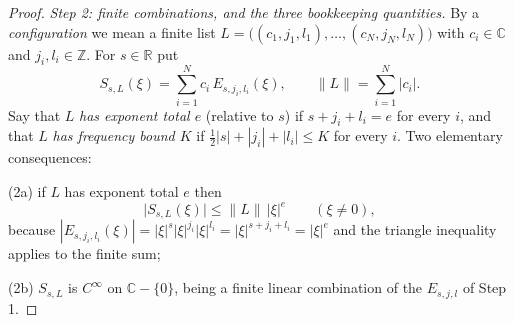 \begin{proof}
\emph{Step 2: finite combinations, and the three bookkeeping quantities.}  By
a \emph{configuration} we mean a finite list
$L=\bigl((c_1,j_1,l_1),\dots,(c_N,j_N,l_N)\bigr)$ with $c_i\in\mathbb{C}$ and
$j_i,l_i\in\mathbb{Z}$.  For $s\in\mathbb{R}$ put
\[
  S_{s,L}(\xi)=\sum_{i=1}^{N}c_i\,E_{s,j_i,l_i}(\xi),
  \qquad
  \|L\|=\sum_{i=1}^{N}|c_i| .
\]
Say that $L$ \emph{has exponent total $e$} (relative to $s$) if
$s+j_i+l_i=e$ for every $i$, and that $L$ \emph{has frequency bound $K$} if
$\tfrac12|s|+|j_i|+|l_i|\le K$ for every $i$.  Two elementary consequences:

(2a) if $L$ has exponent total $e$ then
\begin{equation}\tag{3}
  \bigl|S_{s,L}(\xi)\bigr|\le\|L\|\,|\xi|^{e}\qquad(\xi\ne0),
\end{equation}
because $|E_{s,j_i,l_i}(\xi)|=|\xi|^{s}|\xi|^{j_i}|\xi|^{l_i}
=|\xi|^{s+j_i+l_i}=|\xi|^{e}$ and the triangle inequality applies to the
finite sum;

(2b) $S_{s,L}$ is $C^\infty$ on $\mathbb{C}-\{0\}$, being a finite linear
combination of the $E_{s,j,l}$ of Step 1.


\end{proof}
